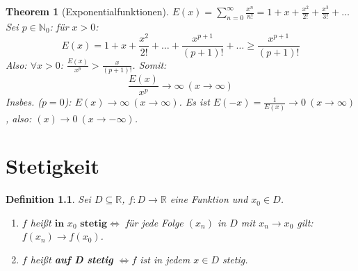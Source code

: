 \documentclass[12pt]{extreport} %
\newcommand{\N}{\mathbb{N}}
\newcommand{\R}{\mathbb{R}}
\theoremstyle{named}
\newtheorem{unnamedtheorem}{Theorem} \counterwithin{unnamedtheorem}{chapter}
\theoremstyle{dotless}
\newtheorem*{definition}{Definition}
\begin{document}
\begin{unnamedtheorem}[Exponentialfunktionen] \label{6.4:prop-Exponentialfunktionen}
	$E(x) = \sum_{n=0}^{\infty} \frac{x^{n}}{n!} = 1 + x + \frac{x^{2}}{2!} + \frac{x^{3}}{3!} + \dotsc$ \\
	Sei $p \in \N_{0}$: für $x > 0$:
		$$ E(x) = 1 + x + \frac{x^{2}}{2!} + \dotsc + \frac{x^{p+1}}{(p+1)!} + \dotsc \geq \frac{x^{p+1}}{(p+1)!} $$
	Also: $\forall x > 0$: $\frac{E(x)}{x^{p}} > \frac{x}{(p+1)!}$.
	Somit:
		$$ \frac{E(x)}{x^{p}} \rightarrow \infty ~(x \rightarrow \infty) $$
	Insbes. ($p = 0$): $E(x) \rightarrow \infty ~(x \rightarrow \infty)$. Es ist $E(-x) = \frac{1}{E(x)} \rightarrow 0 ~(x \rightarrow \infty)$, also: $(x) \rightarrow  0 ~(x \rightarrow -\infty)$.
\end{unnamedtheorem}


\newpage


\chapter{Stetigkeit}

\begin{definition}
	Sei $D \subseteq \R$, $f \colon D \rightarrow \R$ eine Funktion und $x_{0} \in D$. 
	\begin{enumerate}
		\item $f$ hei{\ss}t $\textbf{in }  x_{0} \textbf{ stetig} \iff$ für jede Folge $(x_{n})$ in $D$ mit $x_{n} \rightarrow x_{0}$ gilt: $f(x_{n}) \rightarrow f(x_{0})$.
		\item $f$ hei{\ss}t \textbf{auf D stetig} $\iff f$ ist in jedem $x \in D$ stetig.
	\end{enumerate}
\end{definition}
\end{document}
